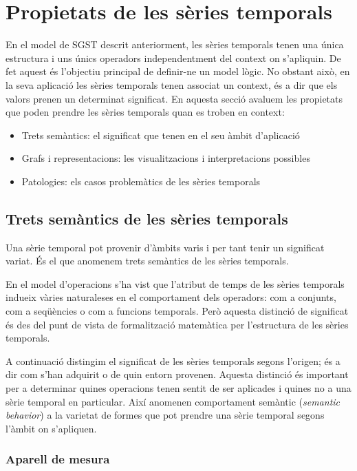 \section{Propietats de les sèries temporals}

En el model de SGST descrit anteriorment, les sèries temporals tenen
una única estructura i uns únics operadors independentment del context
on s'apliquin. De fet aquest és l'objectiu principal de definir-ne
un model lògic. No obstant això, en la seva aplicació les sèries
temporals tenen associat un context, és a dir que els valors prenen un
determinat significat. En aquesta secció avaluem les propietats que
poden prendre les sèries temporals quan es troben en context:
\begin{itemize}
\item Trets semàntics: el significat que tenen en
  el seu àmbit d'aplicació
\item Grafs i representacions: les visualitzacions i interpretacions
  possibles
\item Patologies: els casos problemàtics de les sèries temporals
\end{itemize}




\subsection{Trets semàntics de les sèries temporals}

Una sèrie temporal pot provenir d'àmbits varis i per tant tenir un
significat variat. És el que anomenem trets semàntics de les sèries
temporals.


En el model d'operacions s'ha vist que l'atribut de temps de les
sèries temporals indueix vàries naturaleses en el comportament dels
operadors: com a conjunts, com a seqüències o com a funcions
temporals. Però aquesta distinció de significat és des del punt de
vista de formalització matemàtica per l'estructura de les sèries
temporals.

A continuació distingim el significat de les sèries temporals segons
l'origen; és a dir com s'han adquirit o de quin entorn
provenen. Aquesta distinció és important per a determinar quines
operacions tenen sentit de ser aplicades i quines no a una sèrie
temporal en particular. Així \textcite{segev87:sigmod} anomenen
comportament semàntic (\emph{semantic behavior}) a la varietat de
formes que pot prendre una sèrie temporal segons l'àmbit on
s'apliquen.


\subsubsection{Aparell de mesura}

